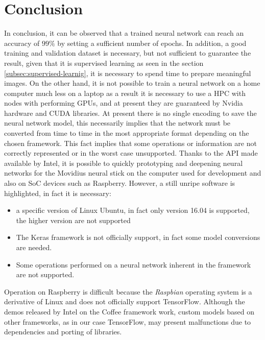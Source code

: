 \section{Conclusion}
\label{sec:conclusion}
In conclusion, it can be observed that a trained neural network can reach an 
accuracy of $99\%$ by setting a sufficient number of epochs. In addition, a 
good training and validation dataset is necessary, but not sufficient to 
guarantee the result, given that it is supervised learning as seen in the 
section \ref{subsec:supervised-learnig}, it is necessary to spend time to 
prepare meaningful images.
On the other hand, it is not possible to train a neural network on a home 
computer much less on a laptop as a result it is necessary to use a HPC with 
nodes with performing GPUs, and at present they are guaranteed by Nvidia 
hardware and CUDA libraries.
At present there is no single encoding to save the neural network model, this 
necessarily implies that the network must be converted from time to time in 
the most appropriate format depending on the chosen framework.
This fact implies that some operations or information are not correctly 
represented or in the worst case unsupported.
Thanks to the API made available by Intel, it is possible to quickly 
prototyping and deepening neural networks for the Movidius neural stick on the 
computer used for development and also on SoC devices such as Raspberry.
However, a still unripe software is highlighted, in fact it is necessary:
\begin{itemize}
\item a specific version of Linux Ubuntu, in fact only version 16.04 is 
supported, the higher version are not supported
\item The Keras framework is not officially support, in fact some model 
conversions are needed.
\item Some operations performed on a neural network inherent in the framework 
are not supported.
\end{itemize}
Operation on Raspberry is difficult because the \emph{Raspbian} operating system
is a derivative of Linux and does not officially support TensorFlow.
Although the demos released by Intel on the Coffee framework work, custom 
models based on other frameworks, as in our case TensorFlow, may present 
malfunctions due to dependencies and porting of libraries.
